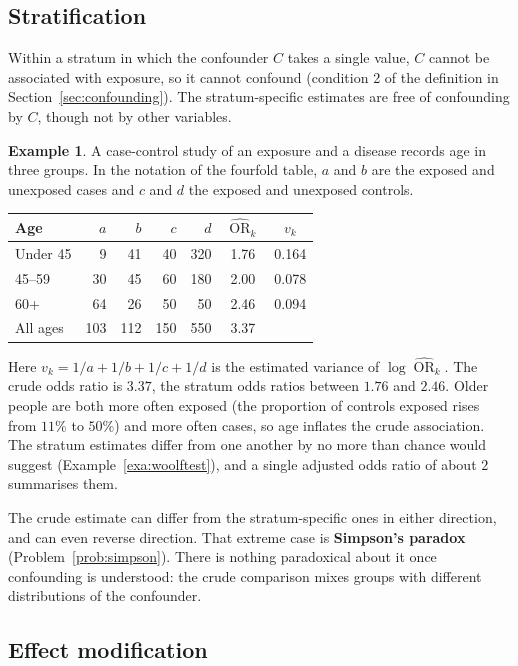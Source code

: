 \documentclass[11pt,a4paper]{article}
\numberwithin{equation}{section}
\DeclareMathOperator{\OR}{OR}
\theoremstyle{definition}
\newtheorem{exa}[thm]{Example}
\begin{document}
\subsection{Stratification}

Within a stratum in which the confounder $C$ takes a single value, $C$ cannot be associated with exposure, so it cannot confound
(condition 2 of the definition in Section~\ref{sec:confounding}). The stratum-specific estimates are free of confounding by $C$, though
not by other variables.

\begin{exa}
\label{exa:strata}
A case-control study of an exposure and a disease records age in three groups. In the notation of the fourfold
table, $a$ and $b$ are the exposed and unexposed cases and $c$ and $d$ the exposed and unexposed controls.
\begin{center}
\begin{tabular}{lrrrrcc}
\hline
Age & $a$ & $b$ & $c$ & $d$ & $\widehat{\OR}_k$ & $v_k$ \\
\hline
Under 45 & 9 & 41 & 40 & 320 & 1.76 & 0.164 \\
45--59 & 30 & 45 & 60 & 180 & 2.00 & 0.078 \\
60+ & 64 & 26 & 50 & 50 & 2.46 & 0.094 \\
\hline
All ages & 103 & 112 & 150 & 550 & 3.37 & \\
\hline
\end{tabular}
\end{center}
Here $v_k = 1/a + 1/b + 1/c + 1/d$ is the estimated variance of $\log\widehat{\OR}_k$.
The crude odds ratio is $3.37$, the stratum odds ratios between $1.76$ and $2.46$. Older people are both more often exposed (the proportion
of controls exposed rises from $11\%$ to $50\%$) and more often cases, so age inflates the crude association. The stratum estimates
differ from one another by no more than chance would suggest (Example~\ref{exa:woolftest}), and a single adjusted odds ratio of about $2$
summarises them.
\end{exa}

The crude estimate can differ from the stratum-specific ones in either direction, and can even reverse direction. That extreme case is
\textbf{Simpson's paradox} (Problem~\ref{prob:simpson}). There is nothing paradoxical about it once confounding is understood: the crude
comparison mixes groups with different distributions of the confounder.

\subsection{Effect modification}
\label{sec:effectmod}
\end{document}
